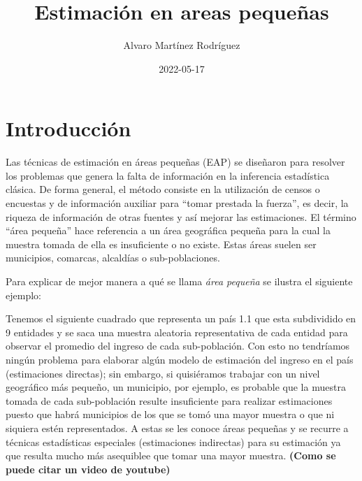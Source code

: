 \documentclass[
  11pt,
  oneside]{book}
\title{Estimación en areas pequeñas}
\author{Alvaro Martínez Rodríguez}
\date{2022-05-17}
\begin{document}
\maketitle

{
\setcounter{tocdepth}{1}
\tableofcontents
}
\hypertarget{introducciuxf3n}{%
\chapter*{Introducción}\label{introducciuxf3n}}

Las técnicas de estimación en áreas pequeñas (EAP) se diseñaron para resolver los problemas que genera la falta de información en la inferencia estadística clásica. De forma general, el método consiste en la utilización de censos o encuestas y de información auxiliar para ``tomar prestada la fuerza'', es decir, la riqueza de información de otras fuentes y así mejorar las estimaciones. El término ``área pequeña'' hace referencia a un área geográfica pequeña para la cual la muestra tomada de ella es insuficiente o no existe. Estas áreas suelen ser municipios, comarcas, alcaldías o sub-poblaciones.

Para explicar de mejor manera a qué se llama \emph{área pequeña} se ilustra el siguiente ejemplo:

Tenemos el siguiente cuadrado que representa un país 1.1 que esta subdividido en 9 entidades y se saca una muestra aleatoria representativa de cada entidad para observar el promedio del ingreso de cada sub-población. Con esto no tendríamos ningún problema para elaborar algún modelo de estimación del ingreso en el país (estimaciones directas); sin embargo, si quisiéramos trabajar con un nivel geográfico más pequeño, un municipio, por ejemplo, es probable que la muestra tomada de cada sub-población resulte insuficiente para realizar estimaciones puesto que habrá municipios de los que se tomó una mayor muestra o que ni siquiera estén representados. A estas se les conoce áreas pequeñas y se recurre a técnicas estadísticas especiales (estimaciones indirectas) para su estimación ya que resulta mucho más asequiblee que tomar una mayor muestra. \textbf{(Como se puede citar un video de youtube)}
\end{document}
